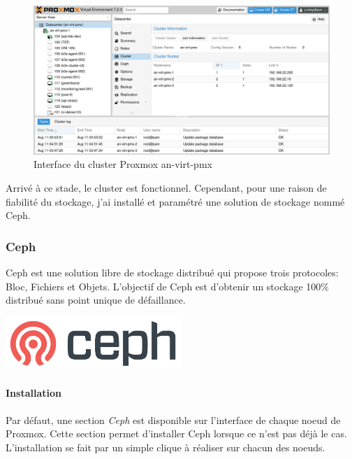 \documentclass[12pt]{article}
\begin{document}
\begin{figure}
    \centering
        \includegraphics[width=\textwidth]{src/proxmox_interface.png}
    \caption{Interface du cluster Proxmox an-virt-pmx}
    \label{fig:proxmox_virt1}
\end{figure}

Arrivé à ce stade, le cluster est fonctionnel. 
Cependant, pour une raison de fiabilité du stockage, j'ai installé et paramétré une solution de stockage nommé Ceph.

\subsubsection{Ceph}
\noindent%
\begin{minipage}{.7\textwidth}%
Ceph est une solution libre de stockage distribué qui propose trois protocoles: Bloc, Fichiers et Objets.
L'objectif de Ceph est d'obtenir un stockage 100\% distribué sans point unique de défaillance.

\end{minipage}%
\hfill
\begin{minipage}{.3\textwidth}%
\begin{center}
\includegraphics[width=0.5\textwidth]{src/logo_ceph.png}
\end{center}
\end{minipage}%

\paragraph{Installation}
Par défaut, une section \textit{Ceph} est disponible sur l'interface de chaque noeud de Proxmox. 
Cette section permet d'installer Ceph lorsque ce n'est pas déjà le cas.
L'installation se fait par un simple clique à réaliser sur chacun des noeuds.
\end{document}
